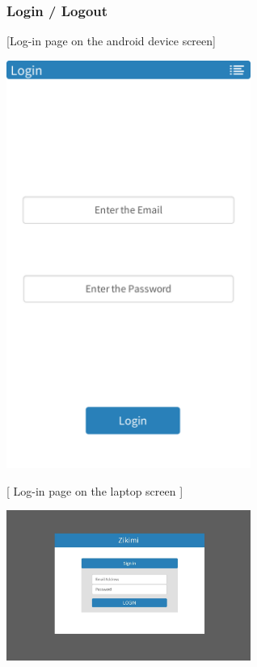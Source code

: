 \documentclass[12pt]{article}
\begin{document}
\subsubsection{Login / Logout}
\begin{center}
[Log-in page on the android device screen] \\ [1\baselineskip]
\end{center}
\begin{center} 
\includegraphics[width=80mm,scale=1.2]{login}
\end{center}
\begin{center}
[ Log-in page on the laptop screen ] \\ [1\baselineskip]
\end{center}
\begin{center} 
\includegraphics[width=80mm,scale=1.2]{laptoplogin}
\end{center}
\end{document}

